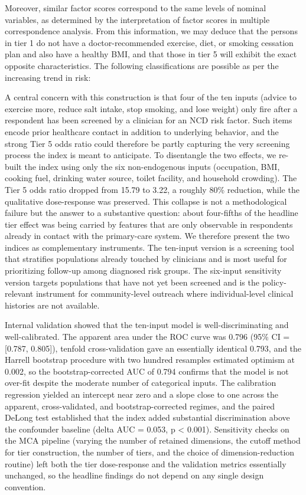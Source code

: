 \documentclass[
  12pt,
  a4paper]{article}
\begin{document}
Moreover, similar factor scores correspond to the same levels of nominal variables, as determined by the interpretation of factor scores in multiple correspondence analysis. From this information, we may deduce that the persons in tier 1 do not have a doctor-recommended exercise, diet, or smoking cessation plan and also have a healthy BMI, and that those in tier 5 will exhibit the exact opposite characteristics. The following classifications are possible as per the increasing trend in risk:



A central concern with this construction is that four of the ten inputs (advice to exercise more, reduce salt intake, stop smoking, and lose weight) only fire after a respondent has been screened by a clinician for an NCD risk factor. Such items encode prior healthcare contact in addition to underlying behavior, and the strong Tier 5 odds ratio could therefore be partly capturing the very screening process the index is meant to anticipate. To disentangle the two effects, we re-built the index using only the six non-endogenous inputs (occupation, BMI, cooking fuel, drinking water source, toilet facility, and household crowding). The Tier 5 odds ratio dropped from 15.79 to 3.22, a roughly 80\% reduction, while the qualitative dose-response was preserved. This collapse is not a methodological failure but the answer to a substantive question: about four-fifths of the headline tier effect was being carried by features that are only observable in respondents already in contact with the primary-care system. We therefore present the two indices as complementary instruments. The ten-input version is a screening tool that stratifies populations already touched by clinicians and is most useful for prioritizing follow-up among diagnosed risk groups. The six-input sensitivity version targets populations that have not yet been screened and is the policy-relevant instrument for community-level outreach where individual-level clinical histories are not available.

Internal validation showed that the ten-input model is well-discriminating and well-calibrated. The apparent area under the ROC curve was 0.796 (95\% CI = {[}0.787, 0.805{]}), tenfold cross-validation gave an essentially identical 0.793, and the Harrell bootstrap procedure with two hundred resamples estimated optimism at 0.002, so the bootstrap-corrected AUC of 0.794 confirms that the model is not over-fit despite the moderate number of categorical inputs. The calibration regression yielded an intercept near zero and a slope close to one across the apparent, cross-validated, and bootstrap-corrected regimes, and the paired DeLong test established that the index added substantial discrimination above the confounder baseline (delta AUC = 0.053, p \textless{} 0.001). Sensitivity checks on the MCA pipeline (varying the number of retained dimensions, the cutoff method for tier construction, the number of tiers, and the choice of dimension-reduction routine) left both the tier dose-response and the validation metrics essentially unchanged, so the headline findings do not depend on any single design convention.
\end{document}
